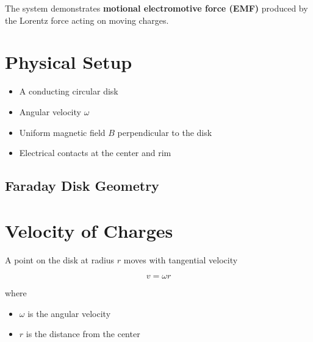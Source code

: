 \documentclass[12pt, a4paper]{article}
\begin{document}
The system demonstrates \textbf{motional electromotive force (EMF)} produced 
by the Lorentz force acting on moving charges.

\section{Physical Setup}

\begin{itemize}
\item A conducting circular disk
\item Angular velocity $\omega$
\item Uniform magnetic field $B$ perpendicular to the disk
\item Electrical contacts at the center and rim
\end{itemize}

\subsection{Faraday Disk Geometry}

\begin{center}
\end{center}

\section{Velocity of Charges}

A point on the disk at radius $r$ moves with tangential velocity

\[
v = \omega r
\]

where

\begin{itemize}
\item $\omega$ is the angular velocity
\item $r$ is the distance from the center
\end{itemize}
\end{document}
